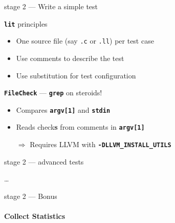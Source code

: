 \documentclass[14pt]{beamer}
\newcommand{\Command}[1]{\textbf{\texttt{#1}}}
\newcommand{\Code}[1]{\textbf{\texttt{#1}}}
\begin{document}
    \begin{frame}{stage 2 --- Write a simple test}
        \begin{alertblock}{\Command{lit} principles}
            \begin{itemize}
                \item One source file (say \texttt{.c} or \texttt{.ll}) per test case
                \item Use comments to describe the test
                \item Use substitution for test configuration
            \end{itemize}
        \end{alertblock}

        \begin{block}{\Command{FileCheck} --- \Command{grep} on steroids!}
            \begin{itemize}
                \item Compares \Code{argv[1]} and \Code{stdin}
                \item Reads check\textbf{s} from comments in \Code{argv[1]}
                \item[$\Rightarrow$] Requires LLVM with \Code{-DLLVM\_INSTALL\_UTILS}
            \end{itemize}
        \end{block}
    \end{frame}

    \begin{frame}[containsverbatim]{stage 2 --- advanced tests}
    \hspace{-1em}\begin{minipage}{\textwidth}
            \footnotesize
            
            \dots
            
        \end{minipage}
    \end{frame}


    \begin{frame}[containsverbatim]{stage 2 --- Bonus}
        \framesubtitle{Collect Statistics}
        {
        \footnotesize
        
        }
        \vspace{-1em}%
        \hspace{-5.5em}%
        \begin{minipage}{\textwidth}
            \footnotesize
            
        \end{minipage}

        {
        \footnotesize
\begin{lstlisting}[language=bash]
% opt -load LLVMMBA.so -mba -stats ...
\end{lstlisting}
        }
    \end{frame}
\end{document}
